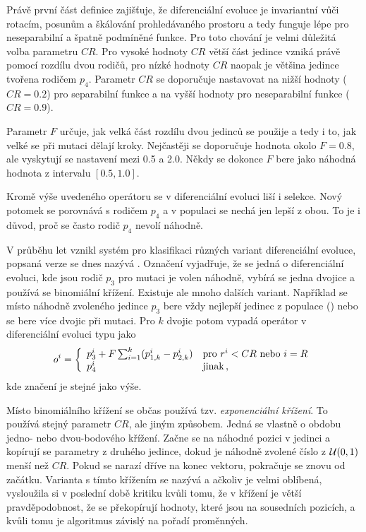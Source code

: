Právě první část definice zajišťuje, že diferenciální evoluce je invariantní vůči rotacím, posunům a škálování prohledávaného prostoru a tedy funguje lépe pro neseparabilní a špatně podmíněné funkce. Pro toto chování je velmi důležitá volba parametru $CR$. Pro vysoké hodnoty $CR$ větší část jedince vzniká právě pomocí rozdílu dvou rodičů, pro nízké hodnoty $CR$ naopak je většina jedince tvořena rodičem $p_4$. Parametr $CR$ se doporučuje nastavovat na nižší hodnoty ($CR=0.2$) pro separabilní funkce a na vyšší hodnoty pro neseparabilní funkce ($CR=0.9$). 

Parametr $F$ určuje, jak velká část rozdílu dvou jedinců se použije a tedy i to, jak velké se při mutaci dělají kroky. Nejčastěji se doporučuje hodnota okolo $F=0.8$, ale vyskytují se nastavení mezi 0.5 a 2.0. Někdy se dokonce $F$ bere jako náhodná hodnota z intervalu $[0.5, 1.0]$. 

Kromě výše uvedeného operátoru se v diferenciální evoluci liší i selekce. Nový potomek se porovnává s rodičem $p_4$ a v populaci se nechá jen lepší z obou. To je i důvod, proč se často rodič $p_4$ nevolí náhodně.

V průběhu let vznikl systém pro klasifikaci různých variant diferenciální evoluce, popsaná verze se dnes nazývá . Označení vyjadřuje, že se jedná o diferenciální evoluci, kde jsou rodič $p_3$ pro mutaci je volen náhodně, vybírá se jedna dvojice a používá se binomiální křížení. Existuje ale mnoho dalších variant\cite{Mezura-Montes:2006:CSD:1143997.1144086}. Například se místo náhodně zvoleného jedince $p_3$ bere vždy nejlepší jedinec z populace () nebo se bere více dvojic při mutaci. Pro $k$ dvojic potom vypadá operátor v diferenciální evoluci typu  jako
$$o^i = \left\{ \begin{array}{ll} p_3^i + F\sum_{i=1}^k(p_{1,k}^i-p_{2,k}^i) & \text{pro } r^i < CR \text{ nebo } i = R \\ p_4^i & \text{jinak} \,, \end{array} \right.$$
kde značení je stejné jako výše. 

Místo binomiálního křížení se občas používá tzv. \emph{exponenciální křížení}. To používá stejný parametr $CR$, ale jiným způsobem. Jedná se vlastně o obdobu jedno- nebo dvou-bodového křížení. Začne se na náhodné pozici v jedinci a kopírují se parametry z druhého jedince, dokud je náhodně zvolené číslo z $\mathcal{U}(0, 1)$ menší než $CR$. Pokud se narazí dříve na konec vektoru, pokračuje se znovu od začátku. Varianta s tímto křížením se nazývá  a ačkoliv je velmi oblíbená, vysloužila si v poslední době kritiku\cite{Tanabe2014} kvůli tomu, že v křížení je větší pravděpodobnost, že se překopírují hodnoty, které jsou na sousedních pozicích, a kvůli tomu je algoritmus závislý na pořadí proměnných.
